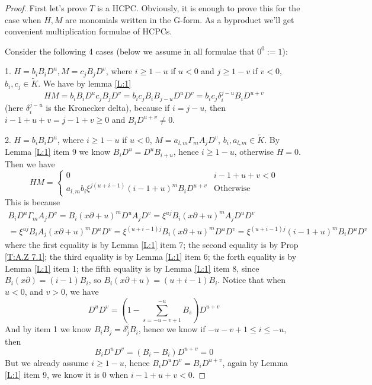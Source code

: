 \documentclass[11pt]{article}
\theoremstyle{definition}
\theoremstyle{plain}
\numberwithin{equation}{section}
\begin{document}
\begin{proof}
	First let's prove $T$ is a HCPC. Obviously, it is enough to prove this for the case when $H, M$ are monomials written in the G-form. As a byproduct we'll get convenient multiplication formulae of HCPCs.
	
	Consider the following 4 cases (below we assume in all formulae that $0^0:=1$):
	
		1. $H=b_iB_iD^u, M=c_jB_jD^v$, where $i\ge 1-u$ if $u<0$ and $j\ge 1-v$ if $v<0$, $b_i,c_j\in \tilde{K}$. We have by lemma \ref{L:1}
		\begin{equation}
		\label{E:BB}
		HM=b_iB_iD^uc_jB_jD^v=b_ic_jB_iB_{j-u}D^uD^v= b_ic_j\delta_i^{j-u}B_iD^{u+v} 
		\end{equation}
(here $\delta_i^{j-u}$ is the Kronecker delta), because if $i=j-u$, then $i-1+u+v=j-1+v\ge 0$ and $B_iD^{u+v}\neq 0$.
		
		2. $H=b_iB_iD^u$, where $i\ge 1-u$ if $u<0$, $M=a_{l,m}\Gamma_m A_jD^v$, $b_i, a_{l,m}\in \tilde{K}$. By Lemma \ref{L:1} item 9 we know $B_iD^u=D^uB_{i+u}$, hence $i\ge 1-u$, otherwise $H=0$. Then we have
		\begin{equation}
		\label{E:BA}
		HM=\begin{cases}
			0 & i-1+u+v < 0
		\\a_{l,m}b_i\xi^{j(u+i-1)}(i-1+u)^m B_iD^{u+v} &\text{Otherwise}
		\end{cases}
		\end{equation}
		This is because 
		\begin{multline*}
		B_iD^u\Gamma_mA_jD^v=B_i(x\partial+u)^mD^uA_jD^v=\xi^{uj}B_i(x\partial+u)^mA_jD^uD^v
		\\=\xi^{uj}B_iA_j(x\partial+u)^mD^uD^v=\xi^{(u+i-1)j}B_i(x\partial+u)^mD^uD^v
		=\xi^{(u+i-1)j}(i-1+u)^mB_iD^uD^v
		\end{multline*}
		where the first equality is by Lemma \ref{L:1} item 7; the second equality is by Prop \ref{T:A.Z 7.1}; the third equality is by Lemma \ref{L:1} item 6; the forth equality is by Lemma \ref{L:1} item 1; the fifth equality is by Lemma \ref{L:1} item 8, since $B_i(x\partial)=(i-1)B_i$, so $B_i(x\partial+u)=(u+i-1)B_i$. Notice that when $u<0$, and $v>0$, we have 
		$$
		D^uD^v=(1-\sum_{s=-u-v+1}^{-u}B_s)D^{u+v}
		$$
		And by item 1 we know $B_iB_j=\delta^i_jB_i$, hence we know if $-u-v+1\leq i\leq -u$, then 
		$$
		B_iD^uD^v=(B_i-B_i)D^{u+v}=0
		$$
		But we already assume $i\ge 1-u$, hence $B_iD^uD^v=B_iD^{u+v}$, again by Lemma \ref{L:1} item 9, we know it is 0 when $i-1+u+v<0$.
		

\end{proof}
\end{document}
